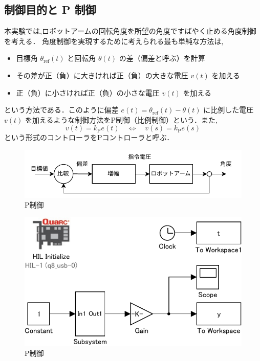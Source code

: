 \subsection{制御目的と P 制御}

本実験では,ロボットアームの回転角度を所望の角度ですばやく止める角度制御を考える．
角度制御を実現するために考えられる最も単純な方法は,
\begin{itemize}
  \item 目標角 \( \theta_{\text{ref}}(t) \) と回転角 \( \theta(t) \) の差（偏差と呼ぶ）を計算
  \item その差が正（負）に大きければ正（負）の大きな電圧 \(v(t)\) を加える
  \item 正（負）に小さければ正（負）の小さな電圧 \(v(t)\) を加える
\end{itemize}
という方法である．このように偏差 \(e(t) = \theta_{\text{ref}}(t) - \theta(t)\) 
に比例した電圧 \(v(t)\) を加えるような制御方法をP制御（比例制御）という．また,
\begin{equation}
  v(t) = k_{\mathrm{P}} e(t) \quad \Longleftrightarrow \quad v(s) = k_{\mathrm{P}} e(s)
\end{equation}
という形式のコントローラをPコントローラと呼ぶ．


\begin{figure}[h]
  \centering
  \includegraphics[scale=1]{sozai/3.pdf}
  \caption{P制御}
\end{figure}

\begin{figure}[h]
  \centering
  \includegraphics[scale=1]{sozai/group03/ad_da/ad_da_conv-crop.pdf}
  \caption{P制御}
\end{figure}

